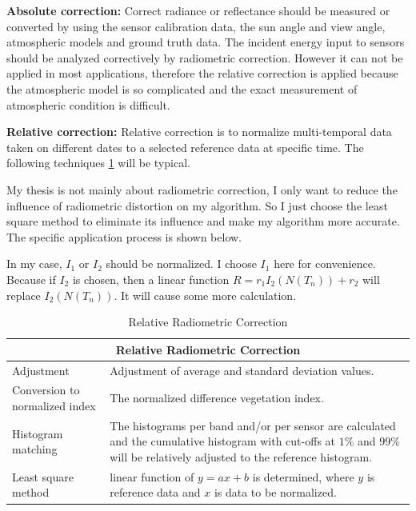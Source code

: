 \textbf{Absolute correction:} Correct radiance or reflectance should be measured or converted by using the sensor calibration data, the sun angle and view angle, atmospheric models and ground truth data. The incident energy input to sensors should be analyzed correctively by radiometric correction. However it can not be applied in most applications, therefore the relative correction is applied because the atmospheric model is so complicated and the exact measurement of atmospheric condition is difficult. 

\textbf{Relative correction:} Relative correction is to normalize multi-temporal data taken on different dates to a selected reference data at specific time. The following techniques \cref{tab:Relative Radiometric Correction} will be typical.

My thesis is not mainly about radiometric correction, I only want to reduce the influence of radiometric distortion on my algorithm. So I just choose the least square method to eliminate its influence and make my algorithm more accurate. The specific application process is shown below.

In my case, $I_1$ or $I_2$ should be normalized. I choose $I_1$ here for convenience. Because if $I_2$ is chosen, then a linear function $R = r_1 I_2(N(T_n)) + r_2 $ will replace $I_2(N(T_n))$. It will cause some more calculation. 

\begin{table}[htbp]
	\centering
	\scriptsize  
	\begin{tabular}{p{80pt} p{260pt}}
		\toprule
		\multicolumn{2}{c}{\bfseries Relative Radiometric Correction}\\ \midrule
		Adjustment   &  Adjustment of average and standard deviation values.\\
		\addlinespace[3pt]
		Conversion to normalized index  &  The normalized difference vegetation index. \\
		\addlinespace[3pt]
		Histogram matching &  The histograms per band and/or per sensor are calculated and the cumulative histogram with cut-offs at $1\%$ and $99\%$ will be relatively adjusted to the reference histogram. \\
		\addlinespace[3pt]
		Least square method & linear function of $y = ax + b$ is determined, where $y$ is reference data and $x$ is data to be normalized. \\ \bottomrule
	\end{tabular}
	\caption{Relative Radiometric Correction}  
	\label{tab:Relative Radiometric Correction} 
\end{table}

